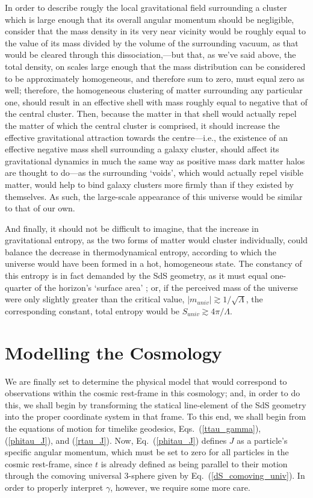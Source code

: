 In order to describe rougly the local gravitational field surrounding a cluster which is large enough that its overall angular momentum should be negligible, consider that the mass density in its very near vicinity would be roughly equal to the value of its mass divided by the volume of the surrounding vacuum, as that would be cleared through this dissociation,---but that, as we've said above, the total density, on scales large enough that the mass distribution can be considered to be approximately homogeneous, and therefore sum to zero, must equal zero as well; therefore, the homogeneous clustering of matter surrounding any particular one, should result in an effective shell with mass roughly equal to negative that of the central cluster. Then, because the matter in that shell would actually repel the matter of which the central cluster is comprised, it should increase the effective gravitational attraction towards the centre---i.e., the existence of an effective negative mass shell surrounding a galaxy cluster, should affect its gravitational dynamics in much the same way as positive mass dark matter halos are thought to do---as the surrounding `voids', which would actually repel visible matter, would help to bind galaxy clusters more firmly than if they existed by themselves. As such, the large-scale appearance of this universe would be similar to that of our own.

And finally, it should not be difficult to imagine, that the increase in gravitational entropy, as the two forms of matter would cluster individually, could balance the decrease in thermodynamical entropy, according to which the universe would have been formed in a hot, homogeneous state. The constancy of this entropy is in fact demanded by the SdS geometry, as it must equal one-quarter of the horizon's `surface area' \cite{Padmanabhan2002c}; or, if the perceived mass of the universe were only slightly greater than the critical value, $|m_{univ}|\gtrsim1/\sqrt{\Lambda}$, the corresponding constant, total entropy would be $S_{univ}\gtrsim4\pi/\Lambda$.

\section{Modelling the Cosmology\label{sec_MC}}
We are finally set to determine the physical model that would correspond to observations within the cosmic rest-frame in this cosmology; and, in order to do this, we shall begin by transforming the statical line-element of the SdS geometry into the proper coordinate system in that frame. To this end, we shall begin from the equations of motion for timelike geodesics, Eqs.~(\ref{ttau_gamma}), (\ref{phitau_J}), and (\ref{rtau_J}). Now, Eq.~(\ref{phitau_J}) defines $J$ as a particle's specific angular momentum, which must be set to zero for all particles in the cosmic rest-frame, since $t$ is already defined as being parallel to their motion through the comoving universal 3-sphere given by Eq.~(\ref{dS_comoving_univ}). In order to properly interpret $\gamma$, however, we require some more care. 

